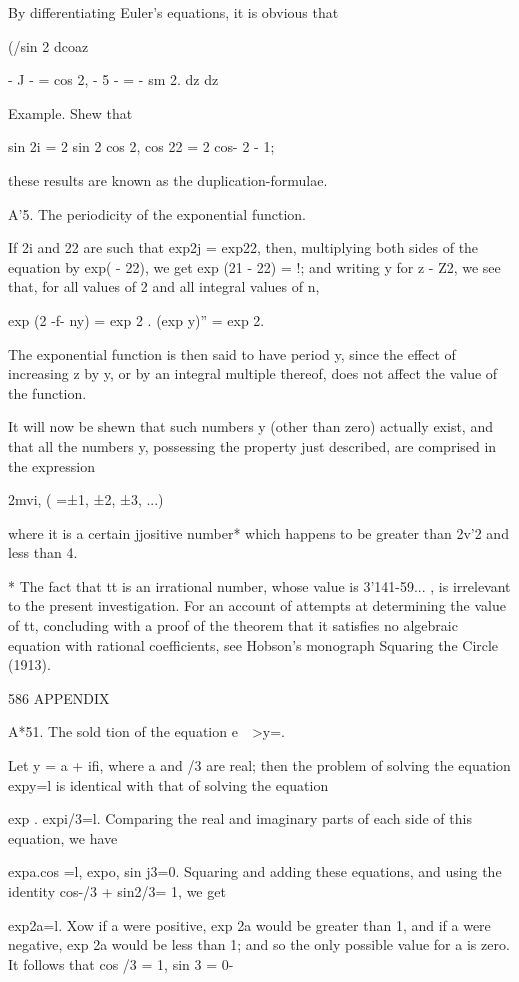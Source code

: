 By differentiating Euler's equations, it is obvious that

(/sin 2 dcoaz

- J - = cos 2, - 5 - = - sm 2. dz dz

Example. Shew that

sin 2i = 2 sin 2 cos 2, cos 22 = 2 cos- 2 - 1;

these results are known as the duplication-formulae.

A'5. The periodicity of the exponential function.

If 2i and 22 are such that exp2j = exp22, then, multiplying both sides
of the equation by exp( - 22), we get exp (21 - 22) = !; and writing
y for z - Z2, we see that, for all values of 2 and all integral values
of n,

exp (2 -f- ny) = exp 2 . (exp y)'' = exp 2.

The exponential function is then said to have period y, since the
effect of increasing z by y, or by an integral multiple thereof, does
not affect the value of the function.

It will now be shewn that such numbers y (other than zero) actually
exist, and that all the numbers y, possessing the property just
described, are comprised in the expression

2mvi, ( =±1, ±2, ±3, ...)

where it is a certain jjositive number* which happens to be greater
than 2v'2 and less than 4.

* The fact that tt is an irrational number, whose value is 3'141-59...
, is irrelevant to the present investigation. For an account of
attempts at determining the value of tt, concluding with a proof of
the theorem that it satisfies no algebraic equation with rational
coefficients, see Hobson's monograph Squaring the Circle (1913).



586 APPENDIX

A*51. The sold tion of the equation e\ \ >y=.

Let y = a + ifi, where a and /3 are real; then the problem of solving
the equation expy=l is identical with that of solving the equation

exp . expi/3=l. Comparing the real and imaginary parts of each side of
this equation, we have

expa.cos =l, expo, sin j3=0. Squaring and adding these equations, and
using the identity cos-/3 + sin2/3= 1, we get

exp2a=l. Xow if a were positive, exp 2a would be greater than 1, and
if a were negative, exp 2a would be less than 1; and so the only
possible value for a is zero. It follows that cos /3 = 1, sin 3 = 0-

